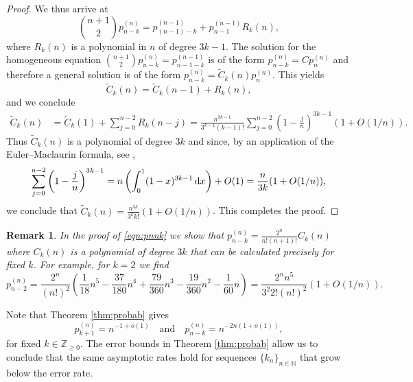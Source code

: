 \documentclass[11pt,a4paper]{article}
\numberwithin{equation}{section}
\newtheorem {remark}[theorem]{Remark}
\newcommand{\dint}{\textup{d}}
\def\NN{\mathbb{N}}
\def\ZZ{\mathbb{Z}}
\begin{document}
\begin{proof}
    We thus arrive at
    \begin{equation*}
        \binom{n+1}{2} p_{n-k}^{(n)} = p_{(n-1)-k}^{(n-1)} + p_{n-1}^{(n-1)} R_k(n),
    \end{equation*}
    where $R_k(n)$ is a polynomial in $n$ of degree $3k-1$.
    The solution for the homogeneous equation $\binom{n+1}{2} p_{n-k}^{(n)} = p_{n-1-k}^{(n-1)}$ is of the form $p_{n-k}^{(n)}=C p_{n}^{(n)}$ and therefore a general solution is of the form $p_{n-k}^{(n)} = \tilde{C}_k(n) p_{n}^{(n)}$. This yields
    \begin{equation*}
        \tilde{C}_k(n) = \tilde{C}_k(n-1) + R_k(n),
    \end{equation*}
    and we conclude
    \begin{align*}
        \tilde{C}_k(n) 
        &= \tilde{C}_k(1) + \sum_{j=0}^{n-2} R_k(n-j) = \frac{n^{3k-1}}{3^{k-1}(k-1)!} \sum_{j=0}^{n-2} \left(1-\frac{j}{n}\right)^{3k-1} (1+O(1/n)).
    \end{align*}
    Thus $\tilde{C}_k(n)$ is a polynomial of degree $3k$ and since, by an application of the Euler--Maclaurin formula, see \cite[Section 7.21]{WiWat},
    \begin{equation*}
        \sum_{j=0}^{n-2} \left(1-\frac{j}{n}\right)^{3k-1} =
        n \left(\int_{0}^{1} (1-x)^{3k-1}\, \dint x\right) + O(1) =
        \frac{n}{3k} (1+O(1/n)),
    \end{equation*}
    we conclude that $\tilde{C}_k(n) = \frac{n^{3k}}{3^k k!}(1+O(1/n))$.
    This completes the proof.
\end{proof}

\begin{remark}
    In the proof of \eqref{eqn:pnnk} we show that $p_{n-k}^{(n)}=\frac{2^n}{n! (n+1)!} C_k(n)$ where $C_k(n)$ is a polynomial of degree $3k$ that can be calculated precisely for fixed $k$. For example, for $k=2$ we find
    \begin{equation*}
        p_{n-2}^{(n)} 
        = \frac{2^n}{(n!)^2} \left(\frac{1}{18} n^5 - \frac{37}{180} n^4 + \frac{79}{360} n^3 - \frac{19}{360} n^2 - \frac{1}{60} n\right)
        = \frac{2^n n^5}{3^2 2! (n!)^2} (1+O(1/n)).
    \end{equation*}
\end{remark}

Note that Theorem \ref{thm:probab} gives
\begin{equation*}
    p_{k+1}^{(n)} = n^{-1+o(1)} \quad \text{and} \quad p_{n-k}^{(n)} = n^{-2n(1+o(1))},
\end{equation*}
for fixed $k\in\ZZ_{\geq 0}$. The error bounds in Theorem \ref{thm:probab} allow us to conclude that the same asymptotic rates hold for sequences $\{k_n\}_{n\in\NN}$ that grow below the error rate.
\end{document}
